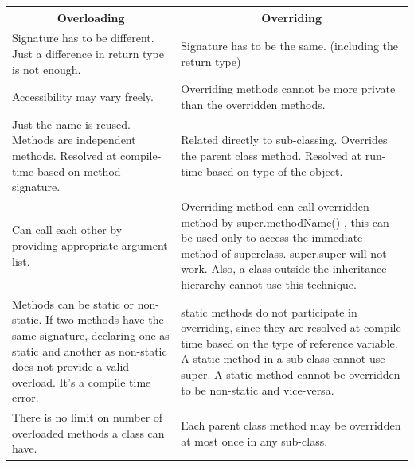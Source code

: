 \documentclass[11pt,a4paper]{article}
\begin{document}
\begin{table}[H]
\centering
\begin{tabular}{|p{5.5 cm}|p{5.5 cm}|} \hline

\multicolumn{1}{|c|}{\textbf{Overloading} } & \multicolumn{1}{|c|}{\textbf{Overriding}} \\\hline
Signature has to be different. Just a difference in return type is not enough. & Signature has to be the same. (including the return type)\\\hline
Accessibility may vary freely. & Overriding methods cannot be more private than the overridden methods. \\ \hline
Just the name is reused. Methods are independent methods. Resolved at compile-time based on method signature. & Related directly to sub-classing. Overrides the parent class method. Resolved at run-time based on type of the object. \\ \hline
Can call each other by providing appropriate argument list. & Overriding method can call overridden method by super.methodName() , this can be used only to access the immediate method of superclass. super.super will not work. Also, a class outside the inheritance hierarchy cannot use this technique. \\ \hline
Methods can be static or non-static. If two methods have the same signature, declaring one as static and another as non-static does not provide a valid overload. It’s a compile time error. & static methods do not participate in overriding, since they are resolved at compile time based on the type of reference variable. A static method in a sub-class cannot use super. A static method cannot be overridden to be non-static and vice-versa. \\ \hline 
There is no limit on number of overloaded methods a class can have. & Each parent class method may be overridden at most once in any sub-class.\\ \hline

\end{tabular}
\end{table}
\vfill{\ }
\end{document}
